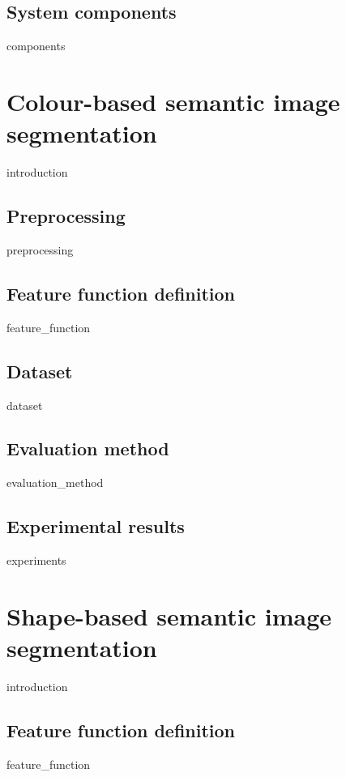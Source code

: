 \documentclass[12pt]{report}
\begin{document}
    \section{System components}	
    {components}

\chapter{Colour-based semantic image segmentation}
    \label{chapter:linear}
    {introduction}
    
    \section{Preprocessing}
    \label{sec:linear_preprocessing}
    {preprocessing}
    
    \section{Feature function definition}	
    {feature_function}
    
    \section{Dataset}	
    \label{sec:linear_dataset}
    {dataset}
    
    \section{Evaluation method}	
    {evaluation_method}
    
    \section{Experimental results}	
    {experiments}
    



\chapter{Shape-based semantic image segmentation}
    \label{chapter:nonlinear}
    {introduction}
    
    \section{Feature function definition}
    {feature_function}
    
\end{document}
